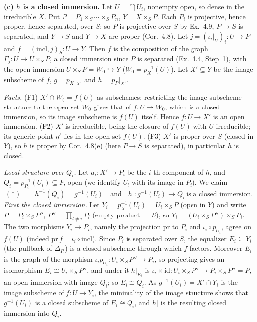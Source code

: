 \documentclass[11pt]{article}
\begin{document}
\textbf{(c) $h$ is a closed immersion.} Let $U=\bigcap U_i$, nonempty open, so dense in the irreducible $X$. Put $P=P_1\times_S\cdots\times_SP_n$, $Y=X\times_SP$. Each $P_i$ is projective, hence proper, hence separated, over $S$; so $P$ is projective over $S$ by Ex.~4.9, $P\to S$ is separated, and $Y\to S$ and $Y\to X$ are proper (Cor.~4.8). Let $j=(\iota_i|_U)_i:U\to P$ and $f=(\text{incl},j)_S:U\to Y$. Then $f$ is the composition of the graph $\Gamma_j:U\to U\times_SP$, a closed immersion since $P$ is separated (Ex.~4.4, Step~1), with the open immersion $U\times_SP=W_0\hookrightarrow Y$ ($W_0=p_X^{-1}(U)$). Let $X'\subseteq Y$ be the image subscheme of $f$, $g=p_X|_{X'}$ and $h=p_P|_{X'}$.

\emph{Facts.} (F1) $X'\cap W_0=f(U)$ as subschemes: restricting the image subscheme structure to the open set $W_0$ gives that of $f:U\to W_0$, which is a closed immersion, so its image subscheme is $f(U)$ itself. Hence $f:U\to X'$ is an open immersion. (F2) $X'$ is irreducible, being the closure of $f(U)$ with $U$ irreducible; its generic point $\eta'$ lies in the open set $f(U)$. (F3) $X'$ is proper over $S$ (closed in $Y$), so $h$ is proper by Cor.~4.8(e) (here $P\to S$ is separated), in particular $h$ is closed.

\emph{Local structure over $Q_i$.} Let $a_i:X'\to P_i$ be the $i$-th component of $h$, and $Q_i=p_{P_i}^{-1}(U_i)\subseteq P$, open (we identify $U_i$ with its image in $P_i$). We claim
\[
(\ast)\qquad h^{-1}(Q_i)=g^{-1}(U_i)\quad\text{and}\quad h|:g^{-1}(U_i)\to Q_i\ \text{is a closed immersion.}
\]
\emph{First the closed immersion.} Let $Y_i=p_X^{-1}(U_i)=U_i\times_SP$ (open in $Y$) and write $P=P_i\times_SP''$, $P''=\prod_{l\neq i}P_l$ (empty product $=S$), so $Y_i=(U_i\times_SP'')\times_SP_i$. The two morphisms $Y_i\to P_i$, namely the projection $\mathrm{pr}$ to $P_i$ and $\iota_i\circ p_{U_i}$, agree on $f(U)$ (indeed $\mathrm{pr}\,f=\iota_i\circ\text{incl}$). Since $P_i$ is separated over $S$, the equalizer $E_i\subseteq Y_i$ (the pullback of $\Delta_{P_i}$) is a closed subscheme through which $f$ factors. Moreover $E_i$ is the graph of the morphism $\iota_ip_{U_i}:U_i\times_SP''\to P_i$, so projecting gives an isomorphism $E_i\cong U_i\times_SP''$, and under it $h|_{E_i}$ is $\iota_i\times\mathrm{id}:U_i\times_SP''\to P_i\times_SP''=P$, an open immersion with image $Q_i$; so $E_i\cong Q_i$. As $g^{-1}(U_i)=X'\cap Y_i$ is the image subscheme of $f:U\to Y_i$, the minimality of the image structure shows that $g^{-1}(U_i)$ is a closed subscheme of $E_i\cong Q_i$, and $h|$ is the resulting closed immersion into $Q_i$.
\end{document}
